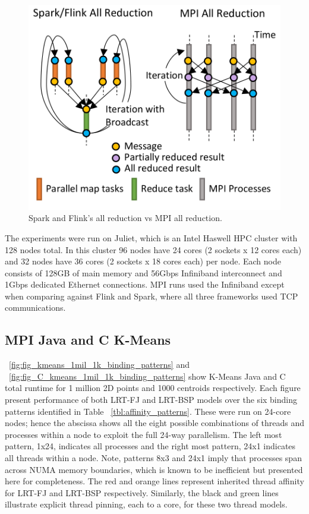 \documentclass[10pt, conference, compsocconf]{IEEEtran}
\begin{document}
\begin{figure}
    \centering
    \includegraphics[width=0.9\columnwidth]{images/fig_flink_vs_mpi_reduction}
    \caption{Spark and Flink's all reduction vs \ac{MPI} all reduction.}
    \label{fig:fig_flink_vs_mpi_reduction}
\end{figure}



The experiments were run on Juliet, which is an Intel Haswell \ac{HPC} cluster with 128 nodes total. In this cluster 96 nodes have 24 cores (2 sockets x 12 cores each) and 32 nodes have 36 cores (2 sockets x 18 cores each) per node. Each node consists of 128GB of main memory and 56Gbps Infiniband interconnect and 1Gbps dedicated Ethernet connections. \ac{MPI} runs used the Infiniband except when comparing against Flink and Spark, where all three frameworks used \ac{TCP} communications.

\subsection{MPI Java and C K-Means}
\figurename~\ref{fig:fig_kmeans_1mil_1k_binding_patterns} and \figurename~\ref{fig:fig_C_kmeans_1mil_1k_binding_patterns} show K-Means Java and C total runtime for 1 million 2D points and 1000 centroids respectively. Each figure present performance of both \ac{LRT-FJ} and \ac{LRT-BSP} models over the six binding patterns identified in Table ~\ref{tbl:affinity_patterns}. These were run on 24-core nodes; hence the abscissa shows all the eight possible combinations of threads and processes within a node to exploit the full 24-way parallelism. The left most pattern, 1x24, indicates all processes and the right most pattern, 24x1 indicates all threads within a node. Note, patterns 8x3 and 24x1 imply that processes span across \ac{NUMA} memory boundaries, which is known to be inefficient but presented here for completeness. The red and orange lines represent inherited thread affinity for \ac{LRT-FJ} and \ac{LRT-BSP} respectively. Similarly, the black and green lines illustrate explicit thread pinning, each to a core, for these two thread models. 
\end{document}
